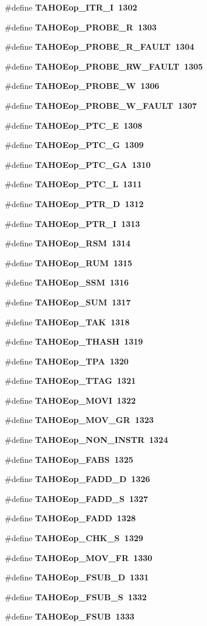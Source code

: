\begin{CompactItemize}
\#define \bf{TAHOEop\_\-ITR\_\-I}~1302
\item 
\#define \bf{TAHOEop\_\-PROBE\_\-R}~1303
\item 
\#define \bf{TAHOEop\_\-PROBE\_\-R\_\-FAULT}~1304
\item 
\#define \bf{TAHOEop\_\-PROBE\_\-RW\_\-FAULT}~1305
\item 
\#define \bf{TAHOEop\_\-PROBE\_\-W}~1306
\item 
\#define \bf{TAHOEop\_\-PROBE\_\-W\_\-FAULT}~1307
\item 
\#define \bf{TAHOEop\_\-PTC\_\-E}~1308
\item 
\#define \bf{TAHOEop\_\-PTC\_\-G}~1309
\item 
\#define \bf{TAHOEop\_\-PTC\_\-GA}~1310
\item 
\#define \bf{TAHOEop\_\-PTC\_\-L}~1311
\item 
\#define \bf{TAHOEop\_\-PTR\_\-D}~1312
\item 
\#define \bf{TAHOEop\_\-PTR\_\-I}~1313
\item 
\#define \bf{TAHOEop\_\-RSM}~1314
\item 
\#define \bf{TAHOEop\_\-RUM}~1315
\item 
\#define \bf{TAHOEop\_\-SSM}~1316
\item 
\#define \bf{TAHOEop\_\-SUM}~1317
\item 
\#define \bf{TAHOEop\_\-TAK}~1318
\item 
\#define \bf{TAHOEop\_\-THASH}~1319
\item 
\#define \bf{TAHOEop\_\-TPA}~1320
\item 
\#define \bf{TAHOEop\_\-TTAG}~1321
\item 
\#define \bf{TAHOEop\_\-MOVI}~1322
\item 
\#define \bf{TAHOEop\_\-MOV\_\-GR}~1323
\item 
\#define \bf{TAHOEop\_\-NON\_\-INSTR}~1324
\item 
\#define \bf{TAHOEop\_\-FABS}~1325
\item 
\#define \bf{TAHOEop\_\-FADD\_\-D}~1326
\item 
\#define \bf{TAHOEop\_\-FADD\_\-S}~1327
\item 
\#define \bf{TAHOEop\_\-FADD}~1328
\item 
\#define \bf{TAHOEop\_\-CHK\_\-S}~1329
\item 
\#define \bf{TAHOEop\_\-MOV\_\-FR}~1330
\item 
\#define \bf{TAHOEop\_\-FSUB\_\-D}~1331
\item 
\#define \bf{TAHOEop\_\-FSUB\_\-S}~1332
\item 
\#define \bf{TAHOEop\_\-FSUB}~1333
\end{CompactItemize}
